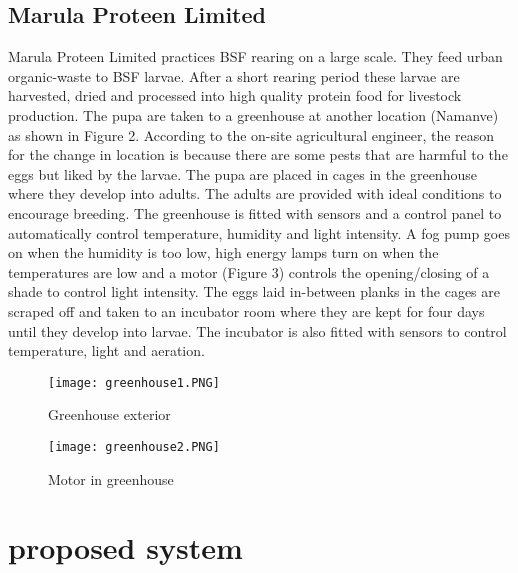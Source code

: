 \documentclass[conference]{IEEEtran}
\begin{document}
\subsection{Marula Proteen Limited}
Marula Proteen Limited practices BSF rearing on a large scale. They feed urban organic-waste to
BSF larvae. After a short rearing period these larvae are harvested, dried and processed into high quality protein food for livestock production. The pupa are taken to a greenhouse at another
location (Namanve) as shown in Figure 2. According to the on-site agricultural engineer, the reason for the change in
location is because there are some pests that are harmful to the eggs but liked by the larvae. The
pupa are placed in cages in the greenhouse where they develop into adults. The adults are provided with ideal conditions to encourage breeding. The greenhouse is fitted with sensors and a control panel to automatically control
temperature, humidity and light intensity. A fog pump goes on when the humidity is too low, high
energy lamps turn on when the temperatures are low and a motor (Figure 3) controls the opening/closing of
a shade to control light intensity. The eggs laid in-between planks in the cages are
scraped off and taken to an incubator room where they are kept for four days until they develop
into larvae. The incubator is also fitted with sensors to control temperature, light and aeration.

\begin{figure}[h]
    \begin{center}
        \texttt{[image: greenhouse1.PNG]}
        \caption{\large Greenhouse exterior}
    \end{center}
\end{figure}

\begin{figure}[h]
    \begin{center}
        \texttt{[image: greenhouse2.PNG]}
        \caption{\large Motor in greenhouse}
    \end{center}
\end{figure}

\section{proposed system}
\end{document}
